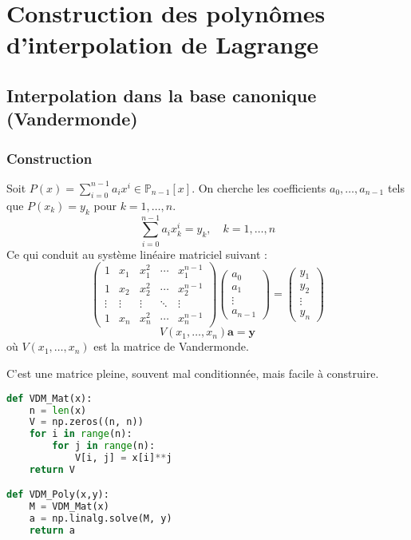\documentclass{article}
\begin{document}
\section{Construction des polynômes d'interpolation de Lagrange}

\subsection{Interpolation dans la base canonique (Vandermonde)}

\subsubsection{Construction}

Soit $P(x) = \sum_{i=0}^{n-1} a_i x^i \in \mathbb{P}_{n-1}[x]$.
On cherche les coefficients $a_0, \dots, a_{n-1}$ tels que $P(x_k) = y_k$ pour $k=1, \dots, n$.
\[
\sum_{i=0}^{n-1} a_i x_k^i = y_k, \quad k=1, \dots, n
\]
Ce qui conduit au système linéaire matriciel suivant :
\[
\begin{pmatrix}
1 & x_1 & x_1^2 & \cdots & x_1^{n-1} \\
1 & x_2 & x_2^2 & \cdots & x_2^{n-1} \\
\vdots & \vdots & \vdots & \ddots & \vdots \\
1 & x_n & x_n^2 & \cdots & x_n^{n-1}
\end{pmatrix}
\begin{pmatrix} a_0 \\ a_1 \\ \vdots \\ a_{n-1} \end{pmatrix} = \begin{pmatrix} y_1 \\ y_2 \\ \vdots \\ y_n \end{pmatrix}
\]
\[
V(x_1, \dots, x_n) \mathbf{a} = \mathbf{y}
\]
où $V(x_1, \dots, x_n)$ est la matrice de Vandermonde.

C'est une matrice pleine, souvent mal conditionnée, mais facile à construire.

\begin{lstlisting}[language=Python]
def VDM_Mat(x):
    n = len(x)
    V = np.zeros((n, n))
    for i in range(n):
        for j in range(n):
            V[i, j] = x[i]**j
    return V

def VDM_Poly(x,y):
    M = VDM_Mat(x)
    a = np.linalg.solve(M, y)
    return a
\end{lstlisting}
\end{document}
